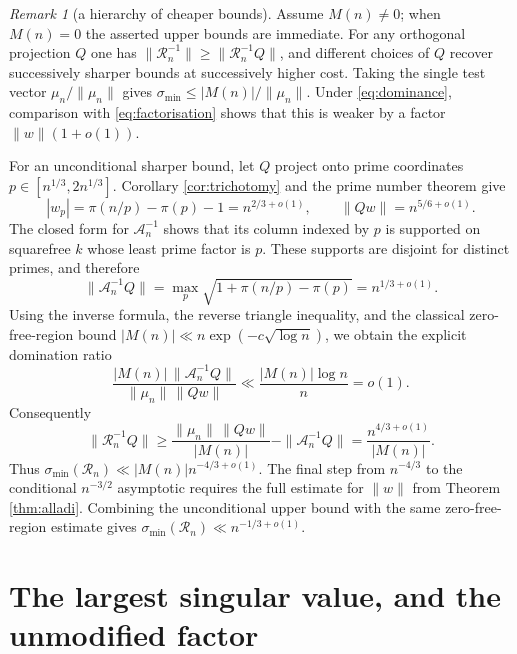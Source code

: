 \documentclass[11pt]{article}
\theoremstyle{definition}
\theoremstyle{remark}
\newtheorem{remark}[theorem]{Remark}
\newcommand{\Rc}{\mathcal{R}}
\newcommand{\Ac}{\mathcal{A}}
\begin{document}
\begin{remark}[a hierarchy of cheaper bounds]\label{rem:hierarchy}
Assume $M(n)\ne0$; when $M(n)=0$ the asserted upper bounds are immediate.
For any orthogonal projection $Q$ one has $\|\Rc_n^{-1}\|\ge\|\Rc_n^{-1}Q\|$, and
different choices of $Q$ recover successively sharper bounds at successively
higher cost. Taking the single test vector $\mu_n/\|\mu_n\|$ gives
$\sigma_{\min}\le|M(n)|/\|\mu_n\|$. Under \eqref{eq:dominance}, comparison with
\eqref{eq:factorisation} shows that this is weaker by a factor
$\|w\|(1+o(1))$.

For an unconditional sharper bound, let $Q$ project onto prime coordinates
$p\in[n^{1/3},2n^{1/3}]$. Corollary \ref{cor:trichotomy} and the prime number
theorem give
\[
 |w_p|=\pi(n/p)-\pi(p)-1=n^{2/3+o(1)},\qquad
 \|Qw\|=n^{5/6+o(1)}.
\]
The closed form for $\Ac_n^{-1}$ shows that its column indexed by $p$ is
supported on squarefree $k$ whose least prime factor is $p$. These supports are
disjoint for distinct primes, and therefore
\[
 \|\Ac_n^{-1}Q\|
 =\max_p\sqrt{1+\pi(n/p)-\pi(p)}=n^{1/3+o(1)}.
\]
Using the inverse formula, the reverse triangle inequality, and the classical
zero-free-region bound \cite{leeleong}
$|M(n)|\ll n\exp(-c\sqrt{\log n})$, we obtain
the explicit domination ratio
\[
 \frac{|M(n)|\,\|\Ac_n^{-1}Q\|}
      {\|\mu_n\|\,\|Qw\|}
 \ll \frac{|M(n)|\log n}{n}=o(1).
\]
Consequently
\[
 \|\Rc_n^{-1}Q\|
 \ge \frac{\|\mu_n\|\,\|Qw\|}{|M(n)|}-\|\Ac_n^{-1}Q\|
 =\frac{n^{4/3+o(1)}}{|M(n)|}.
\]
Thus $\sigma_{\min}(\Rc_n)\ll|M(n)|n^{-4/3+o(1)}$. The final step from
$n^{-4/3}$ to the conditional $n^{-3/2}$ asymptotic requires the full estimate
for $\|w\|$ from Theorem \ref{thm:alladi}. Combining the unconditional upper
bound with the same zero-free-region estimate gives
$\sigma_{\min}(\Rc_n)\ll n^{-1/3+o(1)}$.
\end{remark}

\section{The largest singular value, and the unmodified factor}\label{sec:max}
\end{document}
